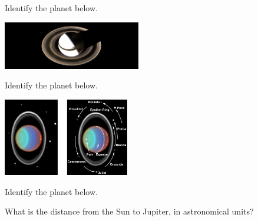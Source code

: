 \documentclass{exam}
\begin{document}
\begin{questions}
\begin{center}
\end{center}

\question
Identify the planet below.

\begin{center}
    \includegraphics[width=6cm,trim={3cm 0cm 3cm 0cm},clip]{Figures/Figure7.7.jpeg}
\end{center}

\question
Identify the planet below.

\begin{center}
    \includegraphics[width=5.5cm]{Figures/Figure11.5.jpeg}
\end{center}

\question
Identify the planet below.

\begin{center}
\end{center}

\question
What is the distance from the Sun to Jupiter, in astronomical units?

\end{questions}
\end{document}
